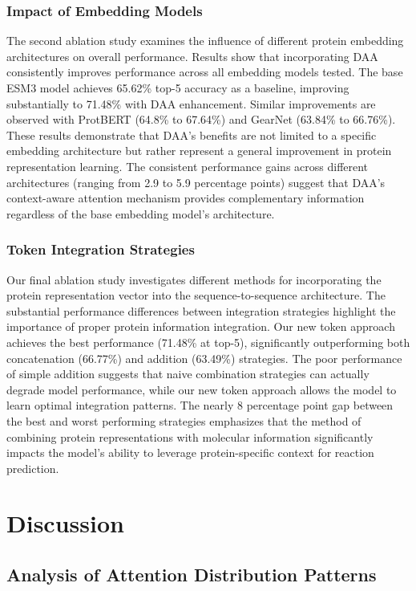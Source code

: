 \documentclass[sigconf]{acmart}
\begin{document}
\subsubsection{Impact of Embedding Models}
The second ablation study examines the influence of different protein embedding architectures on overall performance. Results show that incorporating DAA consistently improves performance across all embedding models tested. The base ESM3 model achieves 65.62\% top-5 accuracy as a baseline, improving substantially to 71.48\% with DAA enhancement. Similar improvements are observed with ProtBERT (64.8\% to 67.64\%) and GearNet (63.84\% to 66.76\%). These results demonstrate that DAA's benefits are not limited to a specific embedding architecture but rather represent a general improvement in protein representation learning. The consistent performance gains across different architectures (ranging from 2.9 to 5.9 percentage points) suggest that DAA's context-aware attention mechanism provides complementary information regardless of the base embedding model's architecture.

\subsubsection{Token Integration Strategies}
Our final ablation study investigates different methods for incorporating the protein representation vector into the sequence-to-sequence architecture. The substantial performance differences between integration strategies highlight the importance of proper protein information integration. Our new token approach achieves the best performance (71.48\% at top-5), significantly outperforming both concatenation (66.77\%) and addition (63.49\%) strategies. The poor performance of simple addition suggests that naive combination strategies can actually degrade model performance, while our new token approach allows the model to learn optimal integration patterns. The nearly 8 percentage point gap between the best and worst performing strategies emphasizes that the method of combining protein representations with molecular information significantly impacts the model's ability to leverage protein-specific context for reaction prediction.

\section{Discussion}

\subsection{Analysis of Attention Distribution Patterns}
\end{document}
